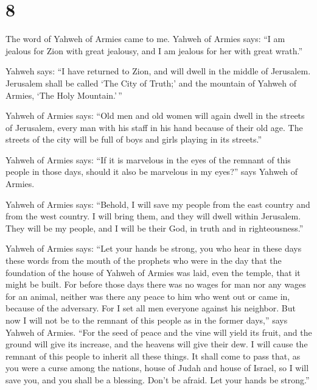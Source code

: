 \hypertarget{section-7}{%
\section{8}\label{section-7}}

 The word of Yahweh of Armies came to me. 
Yahweh of Armies says: ``I am jealous for Zion with great jealousy, and
I am jealous for her with great wrath.''

 Yahweh says: ``I have returned to Zion, and will dwell in
the middle of Jerusalem. Jerusalem shall be called `The City of Truth;'
and the mountain of Yahweh of Armies, `The Holy Mountain.'\,''

 Yahweh of Armies says: ``Old men and old women will again
dwell in the streets of Jerusalem, every man with his staff in his hand
because of their old age.  The streets of the city will be
full of boys and girls playing in its streets.''

 Yahweh of Armies says: ``If it is marvelous in the eyes
of the remnant of this people in those days, should it also be marvelous
in my eyes?'' says Yahweh of Armies.

 Yahweh of Armies says: ``Behold, I will save my people
from the east country and from the west country.  I will
bring them, and they will dwell within Jerusalem. They will be my
people, and I will be their God, in truth and in righteousness.''

 Yahweh of Armies says: ``Let your hands be strong, you
who hear in these days these words from the mouth of the prophets who
were in the day that the foundation of the house of Yahweh of Armies was
laid, even the temple, that it might be built.  For
before those days there was no wages for man nor any wages for an
animal, neither was there any peace to him who went out or came in,
because of the adversary. For I set all men everyone against his
neighbor.  But now I will not be to the remnant of this
people as in the former days,'' says Yahweh of Armies. 
``For the seed of peace and the vine will yield its fruit, and the
ground will give its increase, and the heavens will give their dew. I
will cause the remnant of this people to inherit all these things.
 It shall come to pass that, as you were a curse among
the nations, house of Judah and house of Israel, so I will save you, and
you shall be a blessing. Don't be afraid. Let your hands be strong.''

